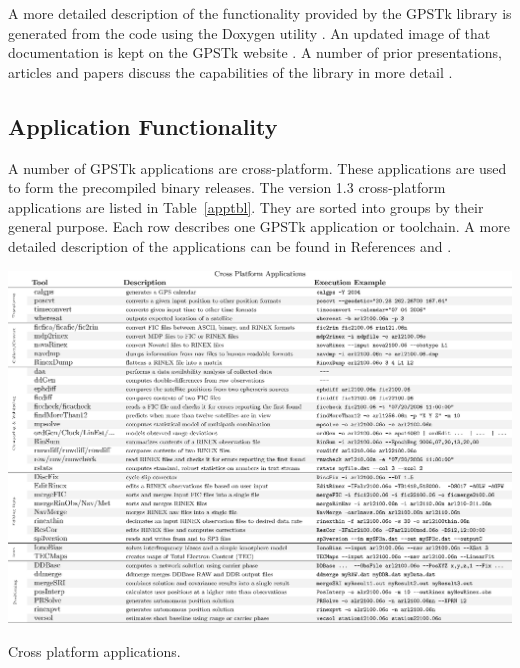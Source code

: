 \documentclass[letterpaper,ugly,10pt]{ion-gps}
\begin{document}
A more detailed description of the functionality provided by the GPSTk library is generated from the code using the Doxygen utility \cite{doxygen}. An updated image of that documentation is kept on the GPSTk website \cite{gpstkwebsite}. A number of prior presentations, articles and papers discuss the capabilities of the library in more detail \cite{lj04,ion:gnss04,ion:gnss05,ion:gnss06,gpssolutions2007}.

\subsection*{Application Functionality}

A number of GPSTk applications are cross-platform. These applications are used to form the precompiled binary releases. The version 1.3 cross-platform applications are listed in Table~\ref{apptbl}. They are sorted into groups by their general 
purpose. Each row describes one GPSTk application or toolchain. A more detailed description of the applications can be found in References \cite{ion:gnss06} and \cite{gpssolutions2007}.

\begin{table}
	\centering
	\includegraphics[width=9in,angle=90,bb=57 73 742 554]{crossplatformapps.eps}
	\caption{Cross platform applications.}
	\label{apptbl}
\end{table}
\end{document}
